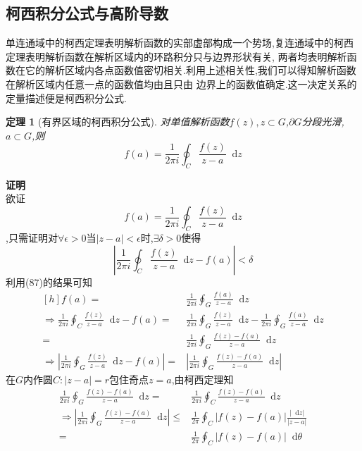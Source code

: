 \documentclass[UTF8]{ctexart}
\newcommand{\dif}{\mathop{}\!\mathrm{d}}
\newtheorem{theorem}{定理}
\begin{document}
\subsection{柯西积分公式与高阶导数}
单连通域中的柯西定理表明解析函数的实部虚部构成一个势场,复连通域中的柯西定理表明解析函数在解析区域内的环路积分只与边界形状有关,
两者均表明解析函数在它的解析区域内各点函数值密切相关.利用上述相关性,我们可以得知解析函数在解析区域内任意一点的函数值均由且只由
边界上的函数值确定.这一决定关系的定量描述便是柯西积分公式.
\begin{theorem}[有界区域的柯西积分公式]
  对单值解析函数$f(z),z\subset G$,$\partial G$分段光滑,$a\subset G$,则
  \begin{equation}
    f(a)=\frac{1}{2\pi i} \oint_{C} \frac{f(z)}{z-a}\dif z
  \end{equation}
\end{theorem}
\textbf{证明} \\
欲证
\begin{equation}
  f(a)=\frac{1}{2\pi i} \oint_{C} \frac{f(z)}{z-a}\dif z
\end{equation}
,只需证明对$\forall \epsilon >0$当$\left| z-a \right|<\epsilon $时,$\exists \delta >0$使得
\begin{equation}
  \left|\frac{1}{2\pi i} \oint_{C} \frac{f(z)}{z-a}\dif z-f(a) \right| <\delta
\end{equation}
利用(87)的结果可知
\begin{equation}
  \begin{aligned}[h]
  f(a)=&\frac{1}{2\pi i}\oint_{G}\frac{f(a)}{z-a}\dif z \\
  \Rightarrow \frac{1}{2\pi i} \oint_{C} \frac{f(z)}{z-a}\dif z-f(a)=&
  \frac{1}{2\pi i} \oint_{G} \frac{f(z)}{z-a}\dif z-\frac{1}{2\pi i}\oint_{G}\frac{f(a)}{z-a}\dif z \\
  =&\frac{1}{2\pi i}\oint_{G}\frac{f(z)-f(a)}{z-a}\dif z \\
  \Rightarrow \left| \frac{1}{2\pi i} \oint_{G} \frac{f(z)}{z-a}\dif z-f(a) \right|=&\left| \frac{1}{2\pi i}\oint_{G}\frac{f(z)-f(a)}{z-a}\dif z \right|
  \end{aligned}
\end{equation}
在$G$内作圆$C:\left| z-a \right| =r$包住奇点$z=a$,由柯西定理知
\begin{align}
  \label{2}
  \frac{1}{2\pi i}\oint_{G}\frac{f(z)-f(a)}{z-a}\dif z=&\frac{1}{2\pi i}\oint_{C}\frac{f(z)-f(a)}{z-a}\dif z \\
  \Rightarrow \left| \frac{1}{2\pi i}\oint_{G}\frac{f(z)-f(a)}{z-a}\dif z \right|\leqslant&\frac{1}{2\pi}\oint_{C}^{}\left| f(z)-f(a) \right| \frac{\left| \dif z \right| }{\left| z-a \right| } \\
  =&\frac{1}{2\pi}\oint_{C}^{}\left| f(z)-f(a) \right|\dif \theta
\end{align}
\end{document}
